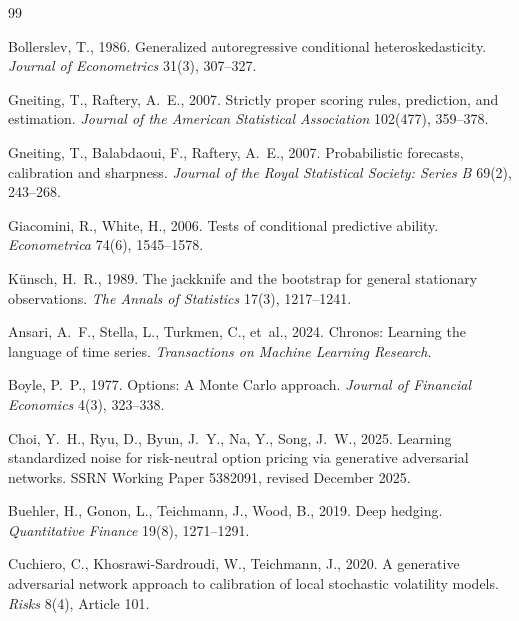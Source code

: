 ﻿\documentclass[12pt,letterpaper]{article}
\begin{document}
\clearpage
\begin{thebibliography}{99}

Bollerslev, T., 1986. Generalized autoregressive conditional
heteroskedasticity. \emph{Journal of Econometrics} 31(3), 307--327.

Gneiting, T., Raftery, A.~E., 2007. Strictly proper scoring rules,
prediction, and estimation. \emph{Journal of the American Statistical
Association} 102(477), 359--378.

Gneiting, T., Balabdaoui, F., Raftery, A.~E., 2007. Probabilistic forecasts,
calibration and sharpness. \emph{Journal of the Royal Statistical Society:
Series B} 69(2), 243--268.

Giacomini, R., White, H., 2006. Tests of conditional predictive ability.
\emph{Econometrica} 74(6), 1545--1578.

K\"unsch, H.~R., 1989. The jackknife and the bootstrap for general stationary
observations. \emph{The Annals of Statistics} 17(3), 1217--1241.

\singlespacing

Ansari, A.~F., Stella, L., Turkmen, C., et~al., 2024. Chronos: Learning the
language of time series. \emph{Transactions on Machine Learning Research}.

Boyle, P.~P., 1977. Options: A Monte Carlo approach. \emph{Journal of
Financial Economics} 4(3), 323--338.

Choi, Y.~H., Ryu, D., Byun, J.~Y., Na, Y., Song, J.~W., 2025. Learning
standardized noise for risk-neutral option pricing via generative adversarial
networks. SSRN Working Paper 5382091, revised December 2025.

Buehler, H., Gonon, L., Teichmann, J., Wood, B., 2019. Deep hedging.
\emph{Quantitative Finance} 19(8), 1271--1291.

Cuchiero, C., Khosrawi-Sardroudi, W., Teichmann, J., 2020. A generative
adversarial network approach to calibration of local stochastic volatility
models. \emph{Risks} 8(4), Article 101.


\end{thebibliography}
\end{document}
